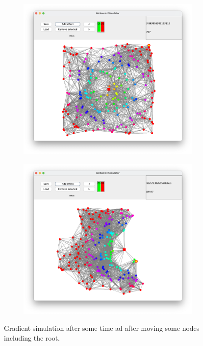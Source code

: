\begin{figure}[ht!]
    \centering
    \begin{subfigure}[b]{0.49\textwidth}
        \centering
        \includegraphics[width=\textwidth]{figures/gradient}
    \end{subfigure}
    \begin{subfigure}[b]{0.49\textwidth}
        \centering
        \includegraphics[width=\textwidth]{figures/gradient-moved}
    \end{subfigure}
    \caption{Gradient simulation after some time ad after moving some nodes including the root.}
    \label{fig:gradient}
\end{figure}


